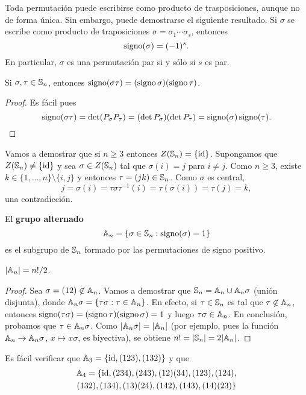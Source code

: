 Toda permutación puede escribirse como producto de trasposiciones, aunque no de forma única. Sin embargo, puede demostrarse el siguiente resultado. Si $\sigma$ se escribe como producto de traposiciones $\sigma=\sigma_1\cdots\sigma_s$, entonces
\[
\operatorname{signo}(\sigma)=(-1)^s.
\] 
En particular, $\sigma$ es una permutación par si y sólo si $s$ es par. 

\begin{proposition}
Si $\sigma,\tau\in\mathbb{S}_n$, entonces $\operatorname{signo}(\sigma\tau)=(\operatorname{signo}\sigma)(\operatorname{signo}\tau)$. 	
\end{proposition}

\begin{proof}
	Es fácil pues 
	\[
	\operatorname{signo}(\sigma\tau)=\det(P_\sigma P_\tau)=(\det P_\sigma)(\det P_\tau)=\operatorname{signo}(\sigma)\operatorname{signo}(\tau).\qedhere
	\]
\end{proof}

\begin{example}
Vamos a demostrar que si $n\geq3$ entonces $Z(\mathbb{S}_n)=\{\operatorname{id}\}$.
Supongamos que $Z(\mathbb{S}_n)\ne\{\operatorname{id}\}$ y 
sea $\sigma\in Z(\mathbb{S}_n)$ tal que $\sigma(i)=j$ para $i\ne j$. Como $n\geq3$, existe $k\in\{1,\dots,n\}\setminus\{i,j\}$ y entonces
$\tau=(jk)\in\mathbb{S}_n$. Como $\sigma$ es central, 
\[
j=\sigma(i)=\tau\sigma\tau^{-1}(i)=\tau(\sigma(i))=\tau(j)=k,
\]
una contradicción.   	
\end{example}

El \textbf{grupo alternado} 
\[
\mathbb{A}_n=\{\sigma\in\mathbb{S}_n:\operatorname{signo}(\sigma)=1\}
\]
es el subgrupo de $\mathbb{S}_n$ formado por las permutaciones de signo positivo. 

\begin{proposition}
$|\mathbb{A}_n|=n!/2$. 
\end{proposition}

\begin{proof}
Sea $\sigma=(12)\not\in\mathbb{A}_n$. Vamos a demostrar que $\mathbb{S}_n=\mathbb{A}_n\cup\mathbb{A}_n\sigma$ (unión disjunta), donde $\mathbb{A}_n\sigma=\{\tau\sigma:\tau\in\mathbb{A}_n\}$. En efecto, si $\tau\in\mathbb{S}_n$ es tal que $\tau\not\in\mathbb{A}_n$, entonces $\operatorname{signo}(\tau\sigma)=(\operatorname{signo}\tau)(\operatorname{signo}\sigma)=1$ y luego
$\tau\sigma\in\mathbb{A}_n$. En conclusión, probamos que $\tau\in\mathbb{A}_n\sigma$. Como $|\mathbb{A}_n\sigma|=|\mathbb{A}_n|$ (por ejemplo, pues la función $\mathbb{A}_n\to\mathbb{A}_n\sigma$, $x\mapsto x\sigma$, es biyectiva), se obtiene $n!=|\mathbb{S}_n|=2|\mathbb{A}_n|$. 
\end{proof}

\begin{example}
Es fácil verificar que 	$\mathbb{A}_3=\{\operatorname{id},(123),(132)\}$ y que  
\begin{multline*}
\mathbb{A}_4=\{\operatorname{id},(234),(243),(12)(34),(123),(124),\\(132),(134),(13)(24),(142),(143),(14)(23)\}\end{multline*}
\end{example}

